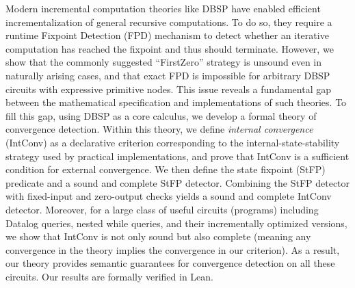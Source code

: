 Modern incremental computation theories like DBSP have enabled efficient incrementalization of general recursive computations. To do so, they require a runtime Fixpoint Detection (FPD) mechanism to detect whether an iterative computation has reached the fixpoint and thus should terminate.
However, we show that the commonly suggested ``FirstZero'' strategy is unsound even in naturally arising cases, and that exact FPD is impossible for arbitrary DBSP circuits with expressive primitive nodes. This issue reveals a fundamental gap between the mathematical specification and implementations of such theories.
To fill this gap, using DBSP as a core calculus, we develop a formal theory of convergence detection. Within this theory, we define \emph{internal convergence} (IntConv) as a declarative criterion corresponding to the internal-state-stability strategy used by practical implementations, and prove that IntConv is a sufficient condition for external convergence.
We then define the state fixpoint (StFP) predicate and a sound and complete StFP detector. Combining the StFP detector with fixed-input and zero-output checks yields a sound and complete IntConv detector.
Moreover, for a large class of useful circuits (programs) including Datalog queries, nested while queries, and their incrementally optimized versions, we show that IntConv is not only sound but also complete (meaning any convergence in the theory implies the convergence in our criterion). 
As a result, our theory provides semantic guarantees for convergence detection on all these circuits.
Our results are formally verified in Lean.
